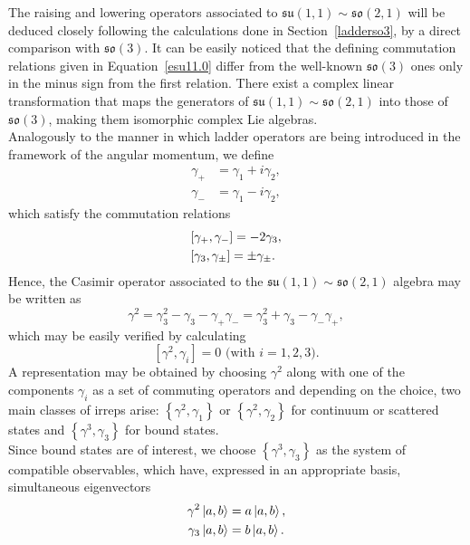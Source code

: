 \documentclass[12pt,a4paper]{report}
\theoremstyle{definition}
\theoremstyle{remark}
\theoremstyle{remark}
\begin{document}
The raising and lowering operators associated to $\mathfrak{su}(1,1)\sim\mathfrak{so}(2,1)$ will be deduced closely following the calculations done in Section~\ref{ladderso3}, by a direct comparison with $\mathfrak{so}(3)$. It can be easily noticed that the defining commutation relations given in Equation~\ref{esu11.0} differ from the well-known $\mathfrak{so}(3)$ ones only in the minus sign from the first relation. There exist a complex linear transformation that maps the generators of $\mathfrak{su}(1,1)\sim\mathfrak{so}(2,1)$ into those of $\mathfrak{so}(3)$, making them isomorphic complex Lie algebras. \\ \indent
Analogously to the manner in which ladder operators are being introduced in the framework of the angular momentum, we define
\begin{align*}
\gamma_+&=\gamma_1+i\gamma_2,\\
\gamma_-&=\gamma_1-i\gamma_2,
\end{align*}
which satisfy the commutation relations
\begin{equation}\label{eladder1}
\begin{aligned} \relax
&[\gamma_+,\gamma_-]=-2\gamma_3,\\
&[\gamma_3,\gamma_\pm]=\pm\gamma_\pm.
\end{aligned}
\end{equation}
Hence, the Casimir operator associated to the $\mathfrak{su}(1,1)\sim\mathfrak{so}(2,1)$ algebra may be written as
\begin{equation}\label{casimirssu1.1so2.1}
\gamma^2=\gamma_3^2-\gamma_3-\gamma_+\gamma_-=\gamma_3^2+\gamma_3-\gamma_-\gamma_+,
\end{equation}
which may be easily verified by calculating
\begin{equation}\label{eladder2}
[\gamma^2,\gamma_i]=0 \text{ (with }i=1,2,3).
\end{equation}
\indent A representation may be obtained by choosing $\gamma^2$ along with one of the components $\gamma_i$ as a set of commuting operators and depending on the choice, two main classes of irreps arise: $\left\lbrace\gamma^2,\gamma_1\right\rbrace$ or $\left\lbrace\gamma^2,\gamma_2\right\rbrace$ for continuum or scattered states and $\left\lbrace\gamma^3,\gamma_3\right\rbrace$ for bound states. \\ 
Since bound states are of interest, we choose $\left\lbrace\gamma^3,\gamma_3\right\rbrace$ as the system of compatible observables, which have, expressed in an appropriate basis, simultaneous eigenvectors
\begin{align*}
\gamma^2\ket{a,b}&=a\ket{a,b}, \\
\gamma_3\ket{a,b}&=b\ket{a,b}.
\end{align*}
\end{document}
